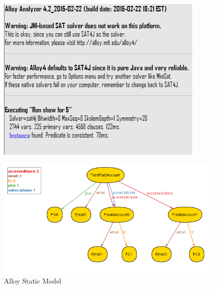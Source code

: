 \documentclass[titlepage]{article}
\begin{document}
		\begin{figure}[H]
			\center
  			\includegraphics[width=\textwidth]{Alloy/staticCheck.png}
 			\label{fig:staticCheckl}
		\end{figure}
		
		\begin{figure}[H]
			\center
  			\includegraphics[width=\textwidth]{Alloy/staticModel.png}
  			\caption{Alloy Static Model}
 			\label{fig:staticModel}
		\end{figure}
	
\end{document}
